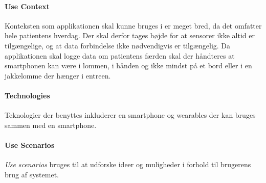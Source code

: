 \paragraph{Use Context}
Konteksten som applikationen skal kunne bruges i er meget bred, da det omfatter hele patientens hverdag.
Der skal derfor tages højde for at sensorer ikke altid er tilgængelige, og at data forbindelse ikke nødvendigvis er tilgængelig.
Da applikationen skal logge data om patientens færden skal der håndteres at smartphonen kan være i lommen, i hånden og ikke mindst på et bord eller i en jakkelomme der hænger i entreen.

\paragraph{Technologies}
Teknologier der benyttes inkluderer en smartphone og wearables der kan bruges sammen med en smartphone.

\paragraph{Use Scenarios}
\textit{Use scenarios} bruges til at udforske ideer og muligheder i forhold til brugerens brug af systemet.

